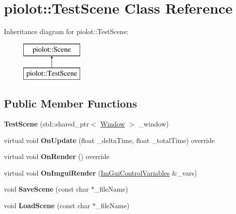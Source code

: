 \hypertarget{classpiolot_1_1_test_scene}{}\section{piolot\+:\+:Test\+Scene Class Reference}
\label{classpiolot_1_1_test_scene}
Inheritance diagram for piolot\+:\+:Test\+Scene\+:\begin{figure}[H]
\begin{center}
\leavevmode
\includegraphics[height=2.000000cm]{classpiolot_1_1_test_scene}
\end{center}
\end{figure}
\subsection*{Public Member Functions}
\begin{DoxyCompactItemize}
\item 
\mbox{\label{classpiolot_1_1_test_scene_a1568f961f1632ccb9da36d14c6aae0d5}} 
{\bfseries Test\+Scene} (std\+::shared\+\_\+ptr$<$ \mbox{\hyperlink{class_window}{Window}} $>$ \+\_\+window)
\item 
\mbox{\label{classpiolot_1_1_test_scene_a1151c075257a2b626774502709e0aab9}} 
virtual void {\bfseries On\+Update} (float \+\_\+delta\+Time, float \+\_\+total\+Time) override
\item 
\mbox{\label{classpiolot_1_1_test_scene_aeaccbb83f264fb4f1e8df5b246033f76}} 
virtual void {\bfseries On\+Render} () override
\item 
\mbox{\label{classpiolot_1_1_test_scene_aa75a09c9c598fc35949f097cbb6df5cb}} 
virtual void {\bfseries On\+Imgui\+Render} (\mbox{\hyperlink{structpiolot_1_1_im_gui_control_variables}{Im\+Gui\+Control\+Variables}} \&\+\_\+vars)
\item 
\mbox{\label{classpiolot_1_1_test_scene_a8fcd4f46ccdb6c49741bb37364d9bb0e}} 
void {\bfseries Save\+Scene} (const char $\ast$\+\_\+file\+Name)
\item 
\mbox{\label{classpiolot_1_1_test_scene_a513072b5c63768aa0fcd0dd5a0a0ca98}} 
void {\bfseries Load\+Scene} (const char $\ast$\+\_\+file\+Name)
\end{DoxyCompactItemize}
